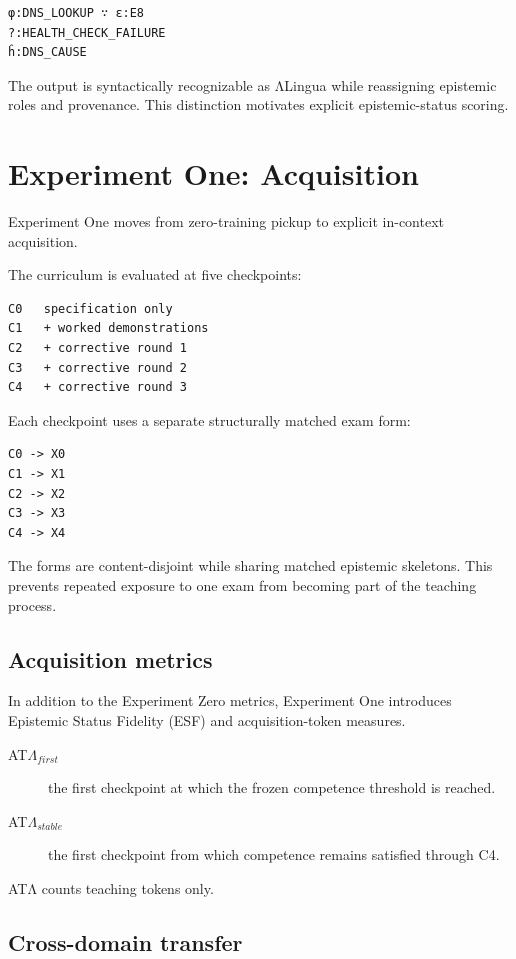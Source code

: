 \documentclass[11pt]{article}
\begin{document}
\begin{verbatim}
φ:DNS_LOOKUP ∵ ε:E8
?:HEALTH_CHECK_FAILURE
ĥ:DNS_CAUSE
\end{verbatim}

The output is syntactically recognizable as ΛLingua while reassigning epistemic roles and provenance. This distinction motivates explicit epistemic-status scoring.

\section{Experiment One: Acquisition}

Experiment One moves from zero-training pickup to explicit in-context acquisition.

The curriculum is evaluated at five checkpoints:

\begin{verbatim}
C0   specification only
C1   + worked demonstrations
C2   + corrective round 1
C3   + corrective round 2
C4   + corrective round 3
\end{verbatim}

Each checkpoint uses a separate structurally matched exam form:

\begin{verbatim}
C0 -> X0
C1 -> X1
C2 -> X2
C3 -> X3
C4 -> X4
\end{verbatim}

The forms are content-disjoint while sharing matched epistemic skeletons. This prevents repeated exposure to one exam from becoming part of the teaching process.

\subsection{Acquisition metrics}

In addition to the Experiment Zero metrics, Experiment One introduces Epistemic Status Fidelity (ESF) and acquisition-token measures.

\begin{description}
  \item[AT$\Lambda_{first}$] the first checkpoint at which the frozen competence threshold is reached.
  \item[AT$\Lambda_{stable}$] the first checkpoint from which competence remains satisfied through C4.
\end{description}

ATΛ counts teaching tokens only.

\subsection{Cross-domain transfer}
\end{document}
